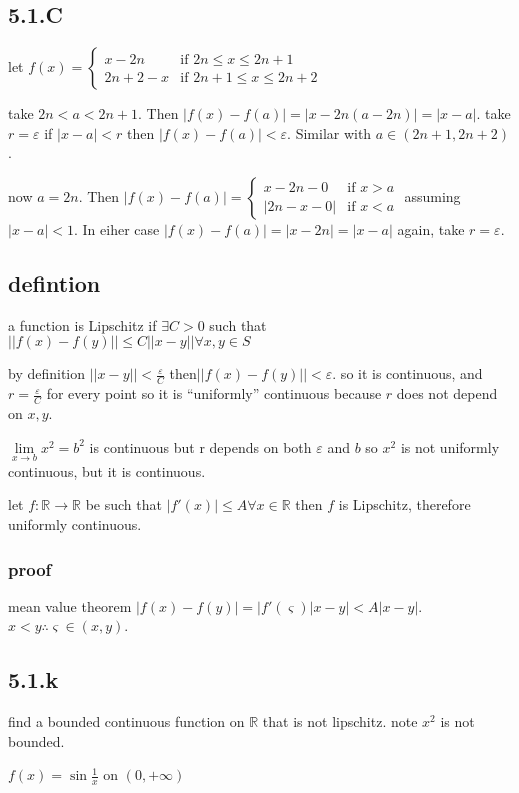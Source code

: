 \documentclass[letterpaper]{article}
\begin{document}
\subsection*{5.1.C}
let $f(x)=\begin{cases}x-2n&\text{if }2n\le x\le 2n+1\\2n+2-x&\text{if }2n+1\le x\le 2n+2\end{cases}$

take $2n<a<2n+1$. Then $|f(x)-f(a)|=|x-2n(a-2n)|=|x-a|$. take $r=\varepsilon$ if $|x-a|<r$ then $|f(x)-f(a)|<\varepsilon$. Similar with $a\in (2n+1,2n+2)$. 

now $a=2n$. Then $|f(x)-f(a)|=\begin{cases}x-2n-0&\text{if }x>a\\|2n-x-0|&\text{if }x<a\end{cases}$ assuming $|x-a|<1$. In eiher case $|f(x)-f(a)|=|x-2n|=|x-a|$ again, take $r=\varepsilon$.
\subsection*{defintion}
a function is Lipschitz if $\exists C>0$ such that $||f(x)-f(y)||\le C||x-y||\forall x,y\in S$

by definition $||x-y||<\frac{\varepsilon}{C}$ then$||f(x)-f(y)||<\varepsilon$. so it is continuous, and $r=\frac{\varepsilon}{C}$ for every point so it is ``uniformly'' continuous because $r$ does not depend on $x,y$.

$\lim\limits_{x\to b} x^2=b^2$ is continuous but r depends on both $\varepsilon$ and $b$ so $x^2$ is not uniformly continuous, but it is continuous.

let $f:\mathbb{R}\to\mathbb{R}$ be such that $|f'(x)|\le A \forall x\in \mathbb{R}$ then $f$ is Lipschitz, therefore uniformly continuous.

\subsubsection*{proof}
mean value theorem
$|f(x)-f(y)|=|f'(\varsigma)|x-y|<A|x-y|$. $x<y\therefore\varsigma\in(x,y)$.

\subsection*{5.1.k}
find a bounded continuous function on $\mathbb{R}$ that is not lipschitz. note $x^2$ is not bounded.

$f(x)=\sin \frac{1}{x}$ on $(0,+\infty)$
\end{document}
